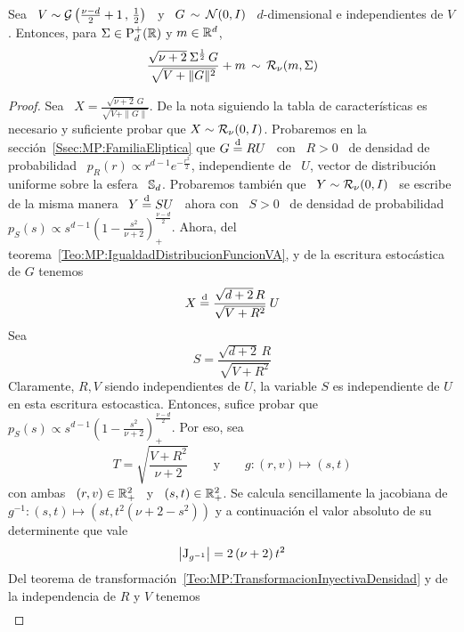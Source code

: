 %
\begin{lema}\label{Lem:MP:StudentRGamma}
%
  Sea \ $V \sim \mathcal{G}\left( \frac{\nu-d}{2}+1 \,  , \, \frac12 \right)$ \ y \ $G \,
  \sim \,  \mathcal{N}(0,I)$ \  $d$-dimensional e independientes  de $V$.  Entonces, para
  $\Sigma \in \mathrm{P}_d^+(\mathbb{R})$ y $m \in \mathbb{R}^d$,
  \[
  \frac{\sqrt{\nu+2} \:  \Sigma^{\frac12} \, G}{\sqrt{V  + \|G\|^2}} + m \,  \sim \,
  \mathcal{R}_\nu( m , \Sigma )
  \]
\end{lema}
\begin{proof}
  Sea \ $X = \frac{\sqrt{\nu+2} \,  G}{\sqrt{V + \|G\|}}$.  De la nota siguiendo
  la tabla  de caracter\'isticas  es necesario y  suficiente probar que  $X \sim
  \mathcal{R}_\nu(0,I)$.  Probaremos en la secci\'on~\ref{Ssec:MP:FamiliaEliptica} que $G
  \stackrel{\mathrm{d}}{=} R U$  \ con \ $R >  0$ \ de densidad de probabilidad  \ $p_R(r) \propto
  r^{d-1} e^{-\frac{r^2}{2}}$, independiente de  \ $U$, vector de distribuci\'on
  uniforme  sobre la esfera  \ $\mathbb{S}_d$.   Probaremos tambi\'en  que \  $Y \sim
  \mathcal{R}_\nu(0,I)$ \ se escribe de la misma manera \ $Y \stackrel{\mathrm{d}}{=} S U$ \ ahora con \ $S
  >  0$ \  de densidad  de probabilidad  \ $p_S(s)  \propto s^{d-1}  \left(  1 -
    \frac{s^2}{\nu+2}       \right)_+^{\frac{\nu-d}{2}}$.        Ahora,      del
  teorema~\ref{Teo:MP:IgualdadDistribucionFuncionVA},   y    de   la   escritura
  estoc\'astica de $G$ tenemos
  \[
  X \stackrel{\mathrm{d}}{=} \frac{\sqrt{d+2} \, R}{\sqrt{V + R^2}} \: U
  \]
  Sea
  \[
  S = \frac{\sqrt{d+2} \, R}{\sqrt{V + R^2}}
  \]
  Claramente,  $R,  V$  siendo  independientes   de  $U$,  la  variable  $S$  es
  independiente de  $U$ en esta  escritura estocastica. Entonces,  sufice probar
  que    $p_S(s)    \propto     s^{d-1}    \left(    1    -    \frac{s^2}{\nu+2}
  \right)_+^{\frac{\nu-d}{2}}$. Por eso, sea
  \[
  T = \sqrt{\frac{V+R^2}{\nu+2}} \qquad \mbox{y} \qquad g: (r,v) \mapsto (s,t)
  \]
  con ambas  \ $(r,v) \in  \mathbb{R}_+^2$ \ y  \ $(s,t) \in \mathbb{R}_+^2$.   Se calcula
  sencillamente  la  jacobiana  de $g^{-1}:  (s,t)  \mapsto  \left(  s t  ,  t^2
    (\nu+2-s^2) \right)$ y a continuaci\'on el valor absoluto de su determinente
  que vale
  \[
  \left| \operatorname{J}_{g^{-1}} \right| = 2 \, (\nu+2) \, t^2
  \]
  Del teorema de transformaci\'on~\ref{Teo:MP:TransformacionInyectivaDensidad} y
  de la independencia de $R$ y $V$ tenemos
  \begin{eqnarray*}

\end{eqnarray*}
\end{proof}
